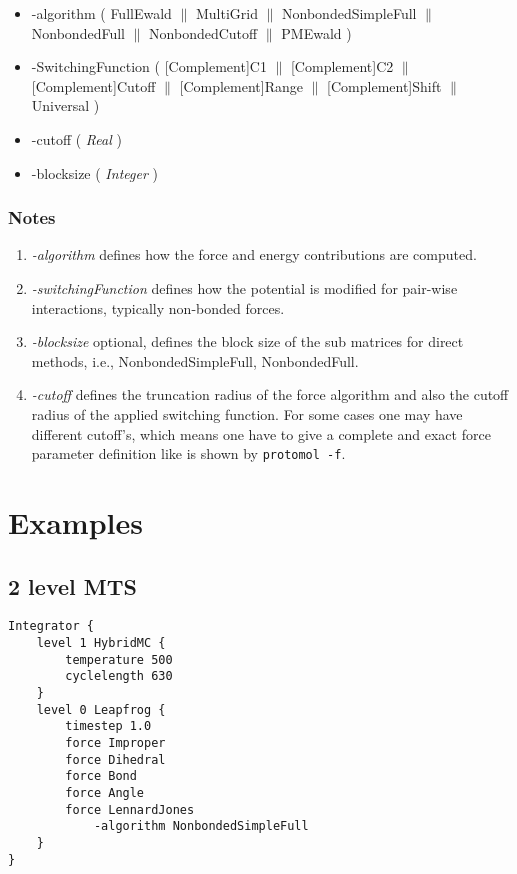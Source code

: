 \documentclass{article}
\begin{document}
\begin{itemize}
\item -algorithm ( FullEwald $\|$  MultiGrid $\|$  NonbondedSimpleFull $\|$  NonbondedFull $\|$ 
  NonbondedCutoff  $\|$ PMEwald )
\item -SwitchingFunction ( [Complement]C1 $\|$  [Complement]C2 $\|$  [Complement]Cutoff $\|$  [Complement]Range $\|$
  [Complement]Shift $\|$  Universal )
\item -cutoff ( \emph{Real} )
\item -blocksize ( \emph{Integer} )
\end{itemize}

\subsubsection*{Notes}
\begin{enumerate}
\item \emph{-algorithm} defines how the force and energy contributions are computed.
\item \emph{-switchingFunction} defines how the potential is modified
  for pair-wise interactions, typically non-bonded forces.
\item \emph{-blocksize} optional, defines the block size of the sub matrices
  for direct methods, i.e., NonbondedSimpleFull, NonbondedFull.
\item \emph{-cutoff} defines the truncation radius of the force
  algorithm and also the cutoff radius of the applied switching
  function. For some cases one may have different cutoff's, which means one
  have to give a complete and exact force parameter definition like is
  shown by \texttt{protomol -f}.  
\end{enumerate}

\newpage
\appendix
\section{Examples}
\subsection{2 level MTS}
\begin{verbatim}
Integrator {
    level 1 HybridMC {
        temperature 500
        cyclelength 630
    }
    level 0 Leapfrog {
        timestep 1.0
        force Improper
        force Dihedral
        force Bond
        force Angle
        force LennardJones
            -algorithm NonbondedSimpleFull
    }
}
\end{verbatim}
\end{document}
